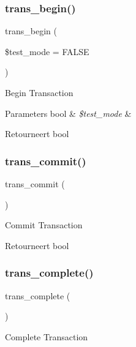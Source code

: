 \subsubsection{\texorpdfstring{trans\_begin()}{trans\_begin()}}
{\footnotesize\ttfamily trans\+\_\+begin (\begin{DoxyParamCaption}\item[{}]{\$test\+\_\+mode = {\ttfamily FALSE} }\end{DoxyParamCaption})}

Begin Transaction


\begin{DoxyParams}[1]{Parameters}
bool & {\em \$test\+\_\+mode} & \\
\hline
\end{DoxyParams}
\begin{DoxyReturn}{Retourneert}
bool 
\end{DoxyReturn}
\mbox{\label{class_c_i___d_b__driver_af4fbdcdace4aa94a139b64877601fe9b}} 
\subsubsection{\texorpdfstring{trans\_commit()}{trans\_commit()}}
{\footnotesize\ttfamily trans\+\_\+commit (\begin{DoxyParamCaption}{ }\end{DoxyParamCaption})}

Commit Transaction

\begin{DoxyReturn}{Retourneert}
bool 
\end{DoxyReturn}
\mbox{\label{class_c_i___d_b__driver_aa0edd209de428801ce5faa1fe740852e}} 
\subsubsection{\texorpdfstring{trans\_complete()}{trans\_complete()}}
{\footnotesize\ttfamily trans\+\_\+complete (\begin{DoxyParamCaption}{ }\end{DoxyParamCaption})}

Complete Transaction

